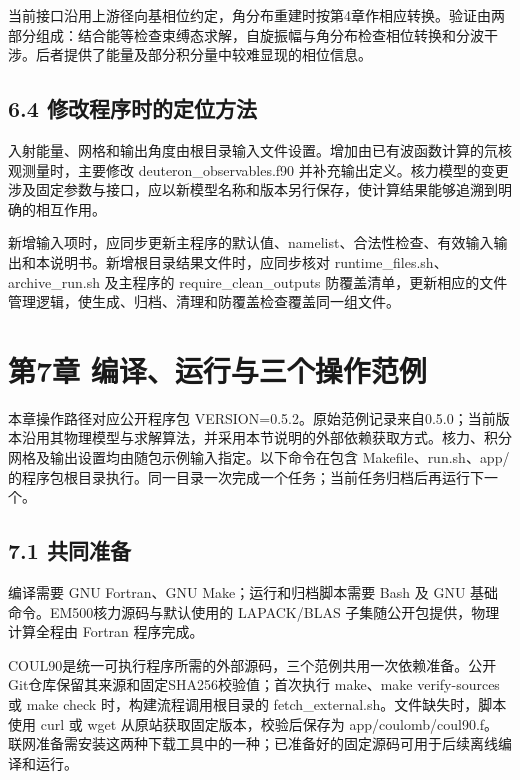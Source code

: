 \documentclass[UTF8,a4paper,zihao=5,fontset=fandol]{ctexart}
\begin{document}
当前接口沿用上游径向基相位约定，角分布重建时按第4章作相应转换。验证由两部分组成：结合能等检查束缚态求解，自旋振幅与角分布检查相位转换和分波干涉。后者提供了能量及部分积分量中较难显现的相位信息。

\subsection*{6.4 修改程序时的定位方法}
入射能量、网格和输出角度由根目录输入文件设置。增加由已有波函数计算的氘核观测量时，主要修改 {\ttfamily\small deuteron\_\allowbreak{}observables.\allowbreak{}f90} 并补充输出定义。核力模型的变更涉及固定参数与接口，应以新模型名称和版本另行保存，使计算结果能够追溯到明确的相互作用。

新增输入项时，应同步更新主程序的默认值、namelist、合法性检查、有效输入输出和本说明书。新增根目录结果文件时，应同步核对 {\ttfamily\small runtime\_\allowbreak{}files.\allowbreak{}sh}、{\ttfamily\small archive\_\allowbreak{}run.\allowbreak{}sh} 及主程序的 {\ttfamily\small require\_\allowbreak{}clean\_\allowbreak{}outputs} 防覆盖清单，更新相应的文件管理逻辑，使生成、归档、清理和防覆盖检查覆盖同一组文件。

\clearpage\section*{第7章 编译、运行与三个操作范例}
本章操作路径对应公开程序包 {\ttfamily\small VERSION=\allowbreak{}0.\allowbreak{}5.\allowbreak{}2}。原始范例记录来自0.5.0；当前版本沿用其物理模型与求解算法，并采用本节说明的外部依赖获取方式。核力、积分网格及输出设置均由随包示例输入指定。以下命令在包含 {\ttfamily\small Makefile}、{\ttfamily\small run.\allowbreak{}sh}、{\ttfamily\small app/\allowbreak{}} 的程序包根目录执行。同一目录一次完成一个任务；当前任务归档后再运行下一个。

\subsection*{7.1 共同准备}
编译需要 GNU Fortran、GNU Make；运行和归档脚本需要 Bash 及 GNU 基础命令。EM500核力源码与默认使用的 LAPACK/BLAS 子集随公开包提供，物理计算全程由 Fortran 程序完成。

COUL90是统一可执行程序所需的外部源码，三个范例共用一次依赖准备。公开Git仓库保留其来源和固定SHA256校验值；首次执行 {\ttfamily\small make}、{\ttfamily\small make verify-sources} 或 {\ttfamily\small make check} 时，构建流程调用根目录的 {\ttfamily\small fetch\_\allowbreak{}external.\allowbreak{}sh}。文件缺失时，脚本使用 {\ttfamily\small curl} 或 {\ttfamily\small wget} 从原站获取固定版本，校验后保存为 {\ttfamily\small app/\allowbreak{}coulomb/\allowbreak{}coul90.\allowbreak{}f}。联网准备需安装这两种下载工具中的一种；已准备好的固定源码可用于后续离线编译和运行。
\end{document}
